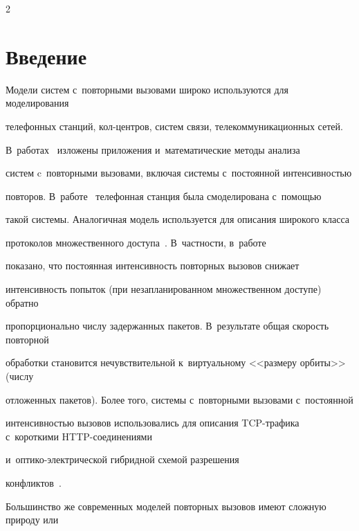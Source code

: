 \begin{multicols}{2}





\label{st\stat}





\section{Введение}





Модели систем с~повторными вызовами широко используются для моделирования  


телефонных станций, кол-цент\-ров, сис\-тем связи, телекоммуникационных сетей. 


В~работах~\cite{Ar1, Ar3} \mbox{изложены}  приложения и~математические методы анализа 


сис\-тем c~повторными вызовами, включая сис\-те\-мы с~постоянной интенсивностью 


повторов. В~работе~\cite{F86}   телефонная станция была смоделирована  с~по\-мощью 


такой сис\-те\-мы. Аналогичная модель используется для описания широкого класса 


протоколов множественного доступа~\cite {CSA92, CRP93}. В~част\-ности, в~работе~\cite{BG92} 


показано, что постоянная интенсивность повторных вызовов  снижает 


интенсивность попыток (при незапланированном множественном доступе) обратно 


пропорционально числу задержанных пакетов. В~результате общая ско\-рость повторной 


обработки становится нечувствительной к~виртуальному <<размеру орбиты>> (числу 


отложенных пакетов). Более того, сис\-те\-мы с~повторными вызовами с~постоянной 


интенсивностью вызовов использовались для описания TCP-тра\-фи\-ка с~короткими HTTP-со\-еди\-не\-ни\-ями~\cite{AY08,AY10} 


и~оп\-ти\-ко-элект\-ри\-че\-ской гиб\-рид\-ной схемой разрешения 


конфликтов~\cite{Wongetal09,Yaoetal02}.





 Большинство же современных моделей повторных вызовов имеют сложную природу или 



\end{multicols}

